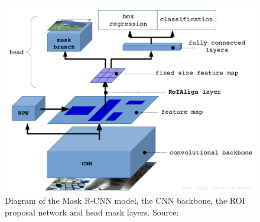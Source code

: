 \begin{figure}[h]
\centering
\includegraphics[width=140mm]{img/mask-rcnn_schema.png}
\caption{Diagram of the Mask {R-CNN} model, the CNN backbone, the ROI proposal network and head mask layers. Source: \cite{mrcnn_schema}}
\label{mrcnn_example}

\end{figure}
